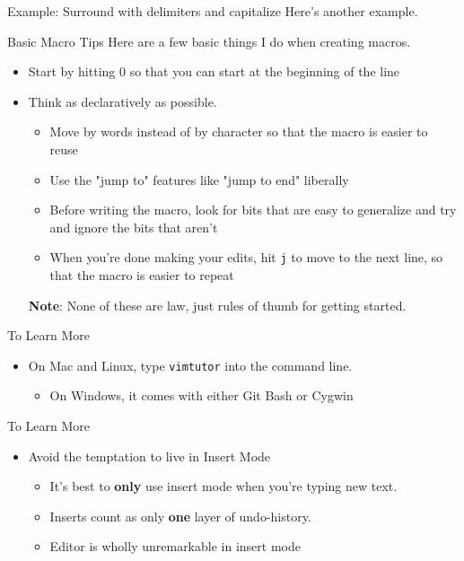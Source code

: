 \documentclass{beamer}
\begin{document}
\begin{frame}{Example: Surround with delimiters and capitalize}
	Here's another example.
\end{frame}
\begin{frame} {Basic Macro Tips}
	Here are a few basic things I do when creating macros. 
	\begin{itemize}
		\item Start by hitting 0 so that you can start at the beginning of the line
		\item Think as declaratively as possible.  \begin{itemize}
				\item Move by words instead of by character so that the macro is easier to reuse
				\item Use the "jump to" features like "jump to end" liberally
				\item Before writing the macro, look for bits that are easy to generalize and try and ignore the bits that aren't
				\item When you're done making your edits, hit \texttt{j} to move to the next line, so that the macro is easier to repeat
		\end{itemize}
			\textbf{Note}: None of these are law, just rules of thumb for getting started. 
	\end{itemize}
\end{frame}
\begin{frame} {To Learn More}
	\begin{itemize}
		\item On Mac and Linux, type \texttt{vimtutor} into the command line. \begin{itemize}
				\item On Windows, it comes with either Git Bash or Cygwin
	        \end{itemize}
	\end{itemize}
\end{frame}
\begin{frame} {To Learn More}
	\begin{itemize}

	\item Avoid the temptation to live in Insert Mode \begin{itemize}
			\item It's best to \textbf{only} use insert mode when you're typing new text. 
			\item Inserts count as only \textbf{one} layer of undo-history. 
			\item Editor is wholly unremarkable in insert mode
	\end{itemize}
	\end{itemize}
\end{frame}
\end{document}
